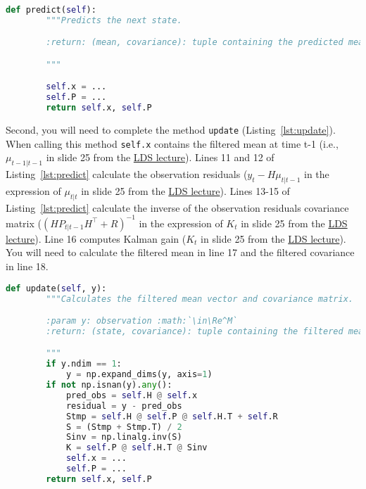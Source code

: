 \documentclass[12pt]{article}
\begin{document}
\begin{lstlisting}[caption={method \texttt{predict} in class \texttt{OnlineKalmanFilter} in module \texttt{inference.py}},label={lst:predict},language=python]
    def predict(self):
        """Predicts the next state.

        :return: (mean, covariance): tuple containing the predicted mean and covariance matrix.

        """

        self.x = ...
        self.P = ...
        return self.x, self.P
\end{lstlisting}

Second, you will need to complete the method \texttt{update}
(Listing~\ref{lst:update}). When calling this method \texttt{self.x} contains
the filtered mean at time t-1 (i.e., $\mu_{t-1|t-1}$ in slide 25 from the
\href{https://github.com/joacorapela/neuroinformatics24/blob/master/lectures/07_linearDynamicalSystems/LDS_SWCNeuroinf2024.pdf}{LDS
lecture}).
%
Lines 11 and 12 of Listing~\ref{lst:predict} calculate the observation
residuals ($y_t-H\mu_{t|t-1}$ in the expression of $\mu_{t|t}$ in slide 25 from
the
\href{https://github.com/joacorapela/neuroinformatics24/blob/master/lectures/07_linearDynamicalSystems/LDS_SWCNeuroinf2024.pdf}{LDS
lecture}).
%
Lines 13-15 of Listing~\ref{lst:predict} calculate the inverse of the
observation residuals covariance matrix ($(HP_{t|t-1}H^\intercal+R)^{-1}$ in
the expression of $K_t$ in slide 25 from the
\href{https://github.com/joacorapela/neuroinformatics24/blob/master/lectures/07_linearDynamicalSystems/LDS_SWCNeuroinf2024.pdf}{LDS
lecture}).
%
Line 16 computes Kalman gain ($K_t$ in slide 25 from the
\href{https://github.com/joacorapela/neuroinformatics24/blob/master/lectures/07_linearDynamicalSystems/LDS_SWCNeuroinf2024.pdf}{LDS
lecture}).
%
You will need to calculate the filtered mean in line 17 and the filtered
covariance in line 18.

\begin{lstlisting}[caption={method \texttt{update} in class \texttt{OnlineKalmanFilter} in module \texttt{inference.py}},label={lst:update},language=python]
    def update(self, y):
        """Calculates the filtered mean vector and covariance matrix.

        :param y: observation :math:`\in\Re^M`
        :return: (state, covariance): tuple containing the filtered mean vector and covariance matrix.

        """
        if y.ndim == 1:
            y = np.expand_dims(y, axis=1)
        if not np.isnan(y).any():
            pred_obs = self.H @ self.x
            residual = y - pred_obs
            Stmp = self.H @ self.P @ self.H.T + self.R
            S = (Stmp + Stmp.T) / 2
            Sinv = np.linalg.inv(S)
            K = self.P @ self.H.T @ Sinv
            self.x = ...
            self.P = ...
        return self.x, self.P

\end{lstlisting}
\end{document}
